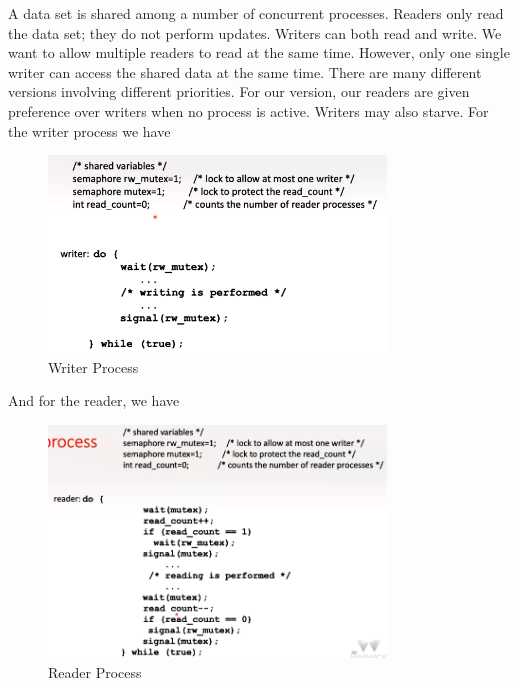 \documentclass[a4paper]{article}
\theoremstyle{plain}
\theoremstyle{definition}
\newtheorem{defn}{Definition}[section]
\theoremstyle{remark}
\begin{document}
\begin{tcolorbox}[colback=black!3!white,colframe=black!60!white,title=\begin{defn}Readers and Writers problem \label{Readers and Writers problem}\end{defn}]
A data set is shared among a number of concurrent processes. Readers only read the data set; they do not perform updates. Writers can both read and write. We want to allow multiple readers to read at the same time. However, only one single writer can access the shared data at the same time. There are many different versions involving different priorities. For our version, our readers are given preference over writers when no process is active. Writers may also starve. For the writer process we have
\begin{figure}[H]
	\centering
	\includegraphics[width=0.8\textwidth]{fiftytwo.png}
	\caption{Writer Process}
	\label{fig:fiftytwo-png}
\end{figure}
And for the reader, we have
\begin{figure}[H]
	\centering
	\includegraphics[width=0.8\textwidth]{fiftythree.png}
	\caption{Reader Process}
	\label{fig:fiftythree-png}
\end{figure}
\end{tcolorbox}
\end{document}
